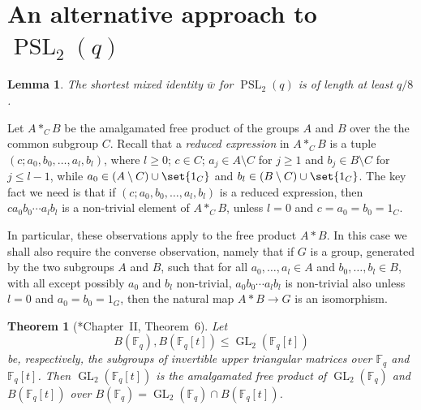 \documentclass[a4paper,11pt]{amsproc}
\newcommand{\finfield}{\mathbb{F}}%
\DeclareMathOperator{\GL}{GL}%
\DeclareMathOperator{\PSL}{PSL}%
\DeclareMathOperator{\PGL}{PGL}%
\theoremstyle{plain}
\newtheorem{theorem}{Theorem}
\newtheorem{lemma}{Lemma}[section]
\theoremstyle{definition}
\begin{document}
	
	\section{An alternative approach to \texorpdfstring{$\PSL_2(q)$}{PSL2}}
	
	\begin{lemma} \label{psl2second}
		The shortest mixed identity $\overline{w}$ for $\PSL_2(q)$ is of length at least $q/8$.
	\end{lemma}
	
	Let $A \ast_C B$ be the amalgamated free product of the groups $A$ and $B$ over the the common subgroup $C$. Recall that a \emph{reduced expression} in $A \ast_C B$ is a tuple $(c;a_0,b_0,\ldots,a_l,b_l)$, where $l \geq 0$; $c\in C$; $a_j\in A \setminus C$ for $j\geq 1$ and $b_j\in B\setminus C$ for $j\leq l-1$, while $a_0\in(A\setminus C)\cup\set{1_C}$ and $b_l\in(B\setminus C)\cup\set{1_C}$. The key fact we need is that if $(c;a_0,b_0,\ldots,a_l,b_l)$ is a reduced expression, then $c a_0 b_0 \cdots a_l b_l$ is a non-trivial element of $A\ast_C B$, unless $l=0$ and $c=a_0=b_0=1_C$. 
	
	In particular, these observations apply to the free product $A\ast B$. In this case we shall also require the converse observation, namely that if $G$ is a group, generated by the two subgroups $A$ and $B$, such that for all $a_0,\ldots,a_l\in A$ and $b_0,\ldots,b_l\in B$, with all except possibly $a_0$ and $b_l$ non-trivial, $a_0 b_0\cdots a_l b_l$ is non-trivial also unless $l=0$ and $a_0=b_0=1_G$, then the natural map $A\ast B\rightarrow G$ is an isomorphism. 
	
	\begin{theorem}[\cite{serre1980trees}*{Chapter~II, Theorem~6}]\label{thm:serre_alg_prod}
		Let $$B(\finfield_q),B(\finfield_q[t])\leq\GL_2(\finfield_q[t])$$ be, respectively, the subgroups of invertible upper triangular matrices over $\finfield_q$ and $\finfield_q[t]$. Then $\GL_2(\finfield_q[t])$ is the amalgamated free product of $\GL_2(\finfield_q)$ and $B(\finfield_q[t])$ over $B(\finfield_q)=\GL_2(\finfield_q) \cap B(\finfield_q[t])$. 
	\end{theorem}
	
\end{document}
